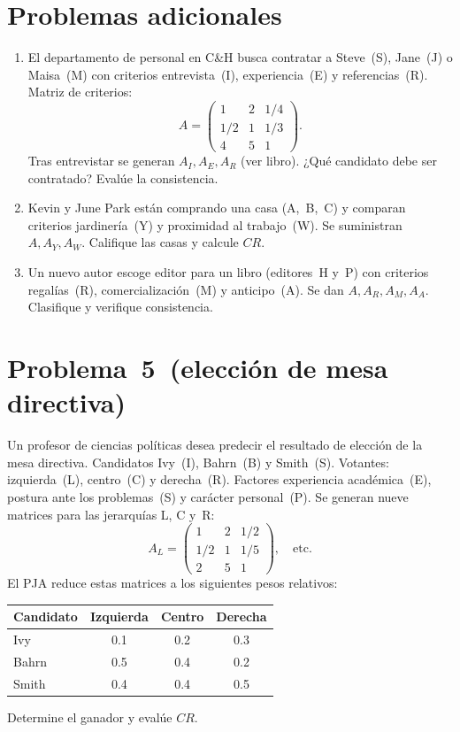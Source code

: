 \documentclass[11pt]{scrartcl}
\begin{document}
\newpage
\section*{Problemas adicionales}
\begin{enumerate}[label=\*\arabic*., start=2]
\item El departamento de personal en C\&H busca contratar a Steve (S), Jane (J) o Maisa (M) con criterios entrevista (I), experiencia (E) y referencias (R). Matriz de criterios:
\[A=\begin{pmatrix}1 & 2 & 1/4\\ 1/2 & 1 & 1/3\\ 4 & 5 & 1\end{pmatrix}.\]
Tras entrevistar se generan $A_I, A_E, A_R$ (ver libro). ¿Qué candidato debe ser contratado? Evalúe la consistencia.

\item Kevin y June Park están comprando una casa (A, B, C) y comparan criterios jardinería (Y) y proximidad al trabajo (W). Se suministran $A, A_Y, A_W$. Califique las casas y calcule $CR$.

\item Un nuevo autor escoge editor para un libro (editores H y P) con criterios regalías (R), comercialización (M) y anticipo (A). Se dan $A, A_R, A_M, A_A$. Clasifique y verifique consistencia.
\end{enumerate}

\newpage
\section*{Problema 5 (elección de mesa directiva)}
Un profesor de ciencias políticas desea predecir el resultado de elección de la mesa directiva. Candidatos Ivy (I), Bahrn (B) y Smith (S). Votantes: izquierda (L), centro (C) y derecha (R). Factores experiencia académica (E), postura ante los problemas (S) y carácter personal (P). Se generan nueve matrices para las jerarquías L, C y R:
\[
A_L=\begin{pmatrix}1 & 2 & 1/2\\ 1/2 & 1 & 1/5\\ 2 & 5 & 1\end{pmatrix},\quad \text{etc.}
\]
El PJA reduce estas matrices a los siguientes pesos relativos:
\begin{table}[H]
\centering
\begin{tabular}{lccc}
\toprule
\textbf{Candidato} & Izquierda & Centro & Derecha\\ \midrule
Ivy & 0.1 & 0.2 & 0.3\\
Bahrn & 0.5 & 0.4 & 0.2\\
Smith & 0.4 & 0.4 & 0.5\\ \bottomrule
\end{tabular}
\end{table}
Determine el ganador y evalúe $CR$.
\end{document}
